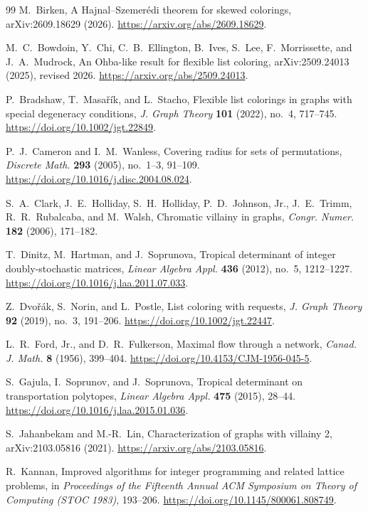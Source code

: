 \documentclass[10pt,a4paper]{amsart}
\numberwithin{equation}{section}
\theoremstyle{definition}
\theoremstyle{remark}
\begin{document}
\begin{thebibliography}{99}
M.~Birken,
A Hajnal--Szemer\'edi theorem for skewed colorings,
arXiv:2609.18629 (2026).
\url{https://arxiv.org/abs/2609.18629}.

M.~C.~Bowdoin, Y.~Chi, C.~B.~Ellington, B.~Ives, S.~Lee,
F.~Morrissette, and J.~A.~Mudrock,
An Ohba-like result for flexible list coloring,
arXiv:2509.24013 (2025), revised 2026.
\url{https://arxiv.org/abs/2509.24013}.

P.~Bradshaw, T.~Masa\v{r}\'ik, and L.~Stacho,
Flexible list colorings in graphs with special degeneracy conditions,
\emph{J. Graph Theory} \textbf{101} (2022), no.~4, 717--745.
\url{https://doi.org/10.1002/jgt.22849}.

P.~J.~Cameron and I.~M.~Wanless,
Covering radius for sets of permutations,
\emph{Discrete Math.} \textbf{293} (2005), no.~1--3, 91--109.
\url{https://doi.org/10.1016/j.disc.2004.08.024}.

S.~A.~Clark, J.~E.~Holliday, S.~H.~Holliday, P.~D.~Johnson, Jr.,
J.~E.~Trimm, R.~R.~Rubalcaba, and M.~Walsh,
Chromatic villainy in graphs,
\emph{Congr. Numer.} \textbf{182} (2006), 171--182.

T.~Dinitz, M.~Hartman, and J.~Soprunova,
Tropical determinant of integer doubly-stochastic matrices,
\emph{Linear Algebra Appl.} \textbf{436} (2012), no.~5, 1212--1227.
\url{https://doi.org/10.1016/j.laa.2011.07.033}.

Z.~Dvo\v{r}\'ak, S.~Norin, and L.~Postle,
List coloring with requests,
\emph{J. Graph Theory} \textbf{92} (2019), no.~3, 191--206.
\url{https://doi.org/10.1002/jgt.22447}.

L.~R.~Ford, Jr., and D.~R.~Fulkerson,
Maximal flow through a network,
\emph{Canad. J. Math.} \textbf{8} (1956), 399--404.
\url{https://doi.org/10.4153/CJM-1956-045-5}.

S.~Gajula, I.~Soprunov, and J.~Soprunova,
Tropical determinant on transportation polytopes,
\emph{Linear Algebra Appl.} \textbf{475} (2015), 28--44.
\url{https://doi.org/10.1016/j.laa.2015.01.036}.

S.~Jahanbekam and M.-R.~Lin,
Characterization of graphs with villainy 2,
arXiv:2103.05816 (2021).
\url{https://arxiv.org/abs/2103.05816}.

R.~Kannan,
Improved algorithms for integer programming and related lattice problems,
in \emph{Proceedings of the Fifteenth Annual ACM Symposium on
Theory of Computing (STOC 1983)}, 193--206.
\url{https://doi.org/10.1145/800061.808749}.


\end{thebibliography}
\end{document}
